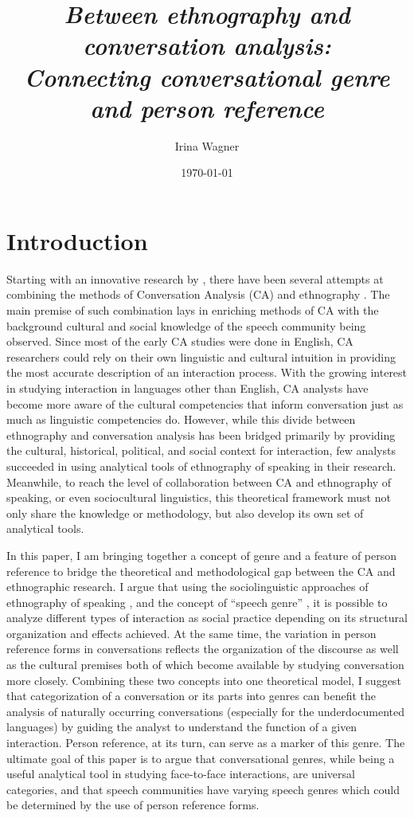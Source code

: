 \documentclass[12pt]{article}
\title{\textit{Between ethnography and conversation analysis: \\ Connecting conversational genre and person reference}}
\author{\vspace{50pt} Irina Wagner}
\date{\today}
\begin{document}
\begin{titlingpage}
\setlength{\droptitle}{100pt}
\maketitle
\end{titlingpage}
\doublespacing
\indent

\section{Introduction}
Starting with an innovative research by \textcite{moerman1988}, there have been several attempts at combining the methods of Conversation Analysis (CA) and ethnography \parencite{sidnell2008, dingemanse2014}. The main premise of such combination lays in enriching methods of CA with the background cultural and social knowledge of the speech community being observed. Since most of the early CA studies were done in English, CA researchers could rely on their own linguistic and cultural intuition in providing the most accurate description of an interaction process. With the growing interest in studying interaction in languages other than English, CA analysts have become more aware of the cultural competencies that inform conversation just as much as linguistic competencies do. However, while this divide between ethnography and conversation analysis has been bridged primarily by providing the cultural, historical, political, and social context for interaction, few analysts succeeded in using analytical tools of ethnography of speaking in their research. Meanwhile, to reach the level of collaboration between CA and ethnography of speaking, or even sociocultural linguistics, this theoretical framework must not only share the knowledge or methodology, but also develop its own set of analytical tools.

In this paper, I am bringing together a concept of genre and a  feature of person reference to bridge the theoretical and methodological gap between the CA and ethnographic research. I argue that using the sociolinguistic approaches of ethnography of speaking \parencite{hymes1974}, and the concept of ``speech genre'' \parencite{bakhtin1986}, it is possible to analyze different types of interaction as social practice depending on its structural organization and effects achieved. At the same time, the variation in person reference forms in conversations reflects the organization of the discourse as well as the cultural premises both of which become available by studying conversation more closely. Combining these two concepts into one theoretical model, I suggest that categorization of a conversation or its parts into genres can benefit the analysis of naturally occurring conversations (especially for the underdocumented languages) by guiding the analyst to understand the function of a given interaction. Person reference, at its turn, can serve as a marker of this genre. The ultimate goal of this paper is to argue that conversational genres, while being a useful analytical tool in studying face-to-face interactions, are universal categories, and that speech communities have varying speech genres which could be determined by the use of person reference forms.
\end{document}
